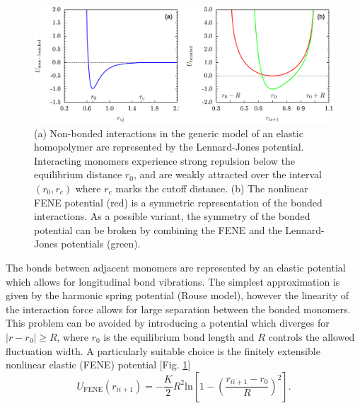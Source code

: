 \documentclass[12pt]{report}
\begin{document}
%
\begin{figure}
\center
\includegraphics[width = 1.01\textwidth]{chapter4Figs/potentialLarge.eps}
\caption{\label{fig:potentials}%
(a) Non-bonded interactions in the generic model of an elastic homopolymer are represented by the Lennard-Jones potential. Interacting monomers experience strong repulsion below the equilibrium distance $r_{0}$, and are weakly attracted over the interval $(r_{0},r_{c})$ where $r_{c}$ marks the cutoff distance.\,\,(b) The nonlinear FENE potential (red) is a symmetric representation of the bonded interactions. As a possible variant, the symmetry of the bonded potential can be broken by combining the FENE and the Lennard-Jones potentials (green).}
\end{figure}
% 

The bonds between adjacent monomers are represented by an elastic potential which allows for longitudinal bond vibrations. The simplest approximation is given by the harmonic spring potential (Rouse model), however the linearity of the interaction force allows for large separation between the bonded monomers. This problem can be avoided by introducing a potential which diverges for $|r-r_{0}|\geq R$, where $r_0$ is the equilibrium bond length and $R$ controls the allowed fluctuation width. A particularly suitable choice is the finitely extensible nonlinear elastic (FENE) potential [Fig.\,\,\ref{fig:potentials}]\cite{Bird1987,Kremer1990,Milchev2001}
%
\begin{equation}
\label{eq:FENE}
U_{\mathrm{FENE}}(r_{ii+1})=-\frac{K}{2}R^2 
\mathrm{ln}\left[1-\left(\frac{r_{ii+1}-r_0}{R}\right)^2\right].
\end{equation}
%
\end{document}
